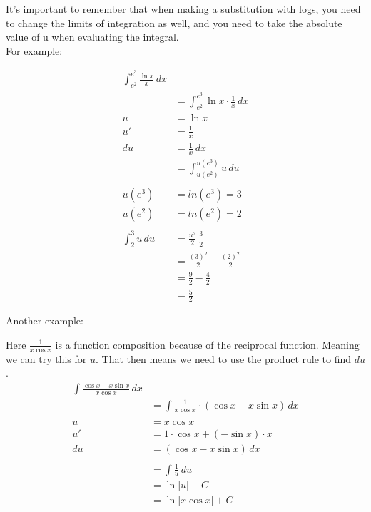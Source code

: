 \noindent It's important to remember that when making a substitution with logs, 
you need to change the limits of integration as well, and you need to take the 
absolute value of u when evaluating the integral.\\

\noindent For example:

\begin{framed}
\begin{align*}
  \int_{e^2}^{e^3} \frac{\ln x}{x} \, dx\\
  &= \int_{e^2}^{e^3} \ln x \cdot \frac{1}{x} \, dx\\
  u &= \ln x\\
  u' &= \frac{1}{x}\\
  du &= \frac{1}{x} \, dx\\
  &= \int_{u(e^2)}^{u(e^3)} u \, du\\\\
  u(e^3) &= ln(e^3) = 3\\
  u(e^2) &= ln(e^2) = 2\\\\
  \int_{2}^{3} u \, du &= \frac{u^2}{2} \biggr\rvert_{2}^{3}\\
  &= \frac{(3)^2}{2} - \frac{(2)^2}{2}\\
  &= \frac{9}{2} - \frac{4}{2}\\
  &= \frac{5}{2}
\end{align*}
\end{framed}

\newpage

\noindent Another example:

\begin{framed}
  Here $\frac{1}{x \cos x}$ is a function composition because of
  the reciprocal function. Meaning we can try this for $u$. That then means
  we need to use the product rule to find $du$.
\begin{align*}
  \int \frac{\cos x - x \sin x}{x\cos x} \, dx\\
  &= \int \frac{1}{x\cos x} \cdot \left(\cos x - x\sin x\right) \, dx\\\\
  u &= x\cos x\\
  u' &= 1 \cdot \cos x + (- \sin x) \cdot x\\
  du &= \left(\cos x - x \sin x\right) \, dx\\\\
  &= \int \frac{1}{u} \, du\\
  &= \ln |u| + C\\
  &= \ln |x\cos x| + C
\end{align*}
\end{framed}


